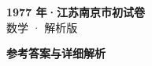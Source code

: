 \documentclass[zihao=-4, a4paper]{ctexart}
\begin{document}
\begin{center}
  {\Large\bfseries 1977 年·江苏南京市初试卷}\\[4pt]
  {\large 数学 · 解析版}
\end{center}
\medskip
{}

\clearpage
{}
\begin{center}{\Large\bfseries 参考答案与详细解析}\end{center}
\medskip

\end{document}
